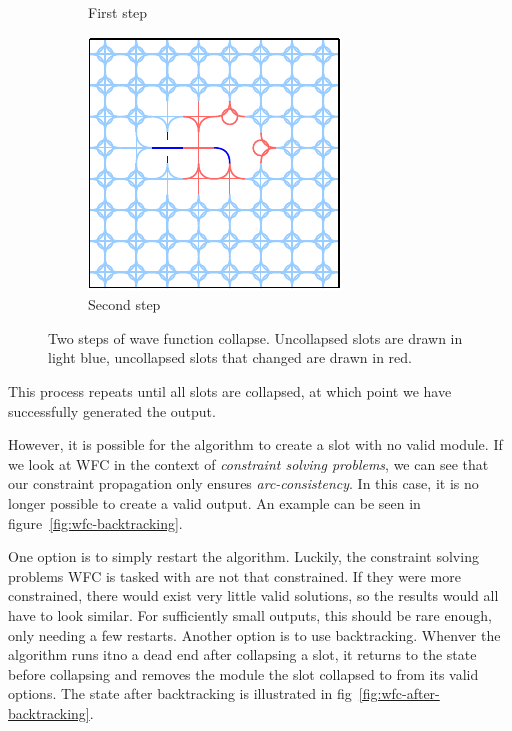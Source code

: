 \begin{figure}
\begin{subfigure}{0.31\textwidth}
        \caption{First step} \label{fig:wfc-step-1}
    \end{subfigure}%
    \hspace*{\fill}
    \begin{subfigure}{0.31\textwidth}
        \includegraphics[width=\linewidth]{img/WFC step 2.pdf}
        \caption{Second step} \label{fig:wfc-step-2}
    \end{subfigure}

    \caption{Two steps of wave function collapse. Uncollapsed slots are drawn in light blue, uncollapsed slots that changed are drawn in red.}\label{fig:wfc-steps}
\end{figure}

This process repeats until all slots are collapsed, at which point we have successfully generated the output.

However, it is possible for the algorithm to create a slot with no valid module.
If we look at WFC in the context of \emph{constraint solving problems}, we can see that our constraint propagation only ensures \emph{arc-consistency}.
In this case, it is no longer possible to create a valid output.
An example can be seen in figure~\ref{fig:wfc-backtracking}.

One option is to simply restart the algorithm.
Luckily, the constraint solving problems WFC is tasked with are not that constrained.
If they were more constrained, there would exist very little valid solutions, so the results would all have to look similar.
For sufficiently small outputs, this should be rare enough, only needing a few restarts.
Another option is to use backtracking.
Whenver the algorithm runs itno a dead end after collapsing a slot, it returns to the state before collapsing and removes the module the slot collapsed to from its valid options.
The state after backtracking is illustrated in fig~\ref{fig:wfc-after-backtracking}.

